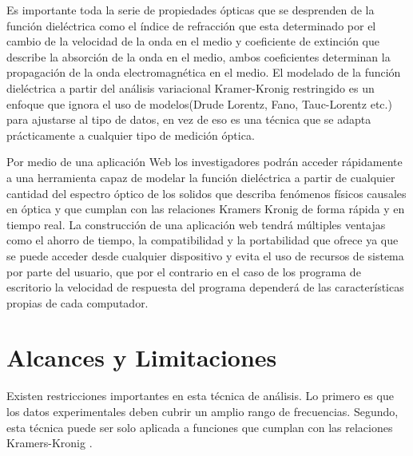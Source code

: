 \documentclass[a4paper,openright,12pt]{book}
\begin{document}
Es importante toda la serie de propiedades ópticas que se desprenden de la función dieléctrica como el índice de refracción que esta determinado por el cambio de la velocidad de la onda en el medio y coeficiente de extinción que describe la absorción de la onda en el medio, ambos coeficientes determinan la propagación de la onda electromagnética en el medio. El modelado de la función dieléctrica a partir del análisis variacional Kramer-Kronig restringido es un enfoque que ignora el uso de modelos(Drude Lorentz, Fano, Tauc-Lorentz etc.) para ajustarse al tipo de datos, en vez de eso es una técnica que se adapta prácticamente a cualquier tipo de medición óptica. 

Por medio de una aplicación Web los investigadores podrán acceder rápidamente a una herramienta capaz de modelar  la función dieléctrica a partir de cualquier cantidad  del espectro óptico de los solidos que describa fenómenos físicos causales en óptica y que cumplan con las relaciones Kramers Kronig de forma rápida y en tiempo real. La construcción de una aplicación web tendrá múltiples ventajas como el ahorro de tiempo, la compatibilidad y la portabilidad que ofrece ya que se puede acceder desde cualquier dispositivo y evita el uso de recursos de sistema por parte del usuario, que por el contrario en el caso de los programa de escritorio la velocidad de respuesta del programa dependerá de las características propias de cada computador.\\


\section{Alcances y Limitaciones}

Existen restricciones importantes en esta técnica de análisis. Lo primero es que los datos experimentales deben cubrir un amplio rango de frecuencias. Segundo, esta técnica puede ser solo aplicada a funciones que cumplan con las relaciones Kramers-Kronig \cite{electrodynamics}. 
\end{document}
